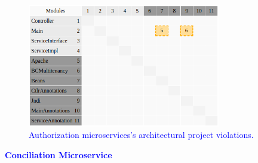 \documentclass[12pt]{article}
\begin{document}
\begin{figure}[ht]
\centering
\includegraphics[width=0.75\textwidth]{figuras/violacoesAuthorization.png}
\caption{\textcolor{blue}{Authorization microservices's architectural project violations.}}
\label{fig:microservices}
\end{figure}

\newpage
\noindent\textbf{\textcolor{blue}{Conciliation Microservice}}
\label{sec:ApendiceConciliation}
\end{document}
